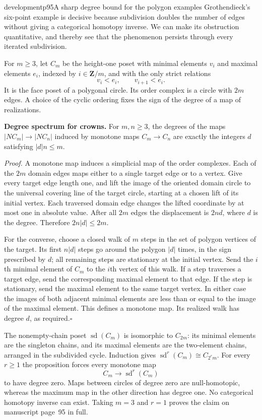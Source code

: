 \begin{dcomment}{development}{p95}{A sharp degree bound for the polygon examples}
Grothendieck's six-point example is decisive because subdivision doubles the number of edges without giving a categorical homotopy inverse. We can make its obstruction quantitative, and thereby see that the phenomenon persists through every iterated subdivision.

For $m\geq3$, let $C_m$ be the height-one poset with minimal elements $v_i$ and maximal elements $e_i$, indexed by $i\in\mathbf Z/m$, and with the only strict relations
\[
 v_i<e_i,\qquad v_{i+1}<e_i.
\]
It is the face poset of a polygonal circle. Its order complex is a circle with $2m$ edges. A choice of the cyclic ordering fixes the sign of the degree of a map of realizations.

\textbf{Degree spectrum for crowns.}\ours\quad
For $m,n\geq3$, the degrees of the maps $|NC_m|\to|NC_n|$ induced by monotone maps $C_m\to C_n$ are exactly the integers $d$ satisfying $|d|n\leq m$.

\emph{Proof.} A monotone map induces a simplicial map of the order complexes. Each of the $2m$ domain edges maps either to a single target edge or to a vertex. Give every target edge length one, and lift the image of the oriented domain circle to the universal covering line of the target circle, starting at a chosen lift of its initial vertex. Each traversed domain edge changes the lifted coordinate by at most one in absolute value. After all $2m$ edges the displacement is $2nd$, where $d$ is the degree. Therefore $2n|d|\leq2m$.

For the converse, choose a closed walk of $m$ steps in the set of polygon vertices of the target. Its first $n|d|$ steps go around the polygon $|d|$ times, in the sign prescribed by $d$; all remaining steps are stationary at the initial vertex. Send the $i$th minimal element of $C_m$ to the $i$th vertex of this walk. If a step traverses a target edge, send the corresponding maximal element to that edge. If the step is stationary, send the maximal element to the same target vertex. In either case the images of both adjacent minimal elements are less than or equal to the image of the maximal element. This defines a monotone map. Its realized walk has degree $d$, as required.\hfill$\square$

The nonempty-chain poset $\operatorname{sd}(C_m)$ is isomorphic to $C_{2m}$: its minimal elements are the singleton chains, and its maximal elements are the two-element chains, arranged in the subdivided cycle. Induction gives $\operatorname{sd}^r(C_m)\cong C_{2^r m}$. For every $r\geq1$ the proposition forces every monotone map
\[
 C_m\longrightarrow\operatorname{sd}^r(C_m)
\]
to have degree zero. Maps between circles of degree zero are null-homotopic, whereas the maximum map in the other direction has degree one. No categorical homotopy inverse can exist. Taking $m=3$ and $r=1$ proves the claim on manuscript page~95 in full.


\end{dcomment}
